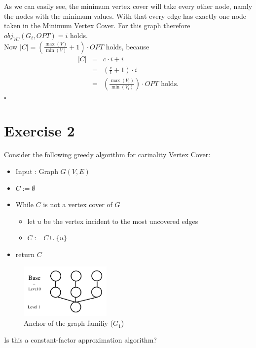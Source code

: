 \documentclass[11pt,a4paper,ngerman]{article}
\begin{document}
\begin{description}
As we can easily see, the minimum vertex cover will take every other node, namly the nodes with the minimum values. With that every edge has exactly one node taken in the Minimum Vertex Cover. For this graph therefore $obj_{VC}(G_i, OPT) = i$ holds.\\

Now $|C| = \left( \frac{\max (V)}{\min (V)} + 1 \right) \cdot OPT$ holds, because
$$
\begin{array}{rcl}
	|C|	&=& c \cdot i + i\\
		&=& \left( \frac{c}{1} + 1 \right) \cdot i\\
		&=& \left( \frac{\max (V_i) }{ \min (V_i) }\right) \cdot OPT \text{ holds.}
\end{array}
$$
\mbox{} \hfill $\square$
\end{description} 


\section*{Exercise 2}
Consider the following greedy algorithm for carinality Vertex Cover:
\begin{itemize}
	\item Input : Graph $G(V,E)$
	\item $C := \emptyset$
	\item While $C$ is not a vertex cover of $G$
		\begin{itemize}
			\item let $u$ be the vertex incident to the most uncovered edges
			\item $C := C \cup \{ u \}$
		\end{itemize}
	\item return $C$
\end{itemize}
\begin{figure}[!b]
	\centering
	\includegraphics[width=1.75in]{ex2_anchor}
	\caption{Anchor of the graph familiy ($G_1$)}
	\label{fig:ex2:anchor}
\end{figure}

Is this a constant-factor approximation algorithm?\\
\end{document}
